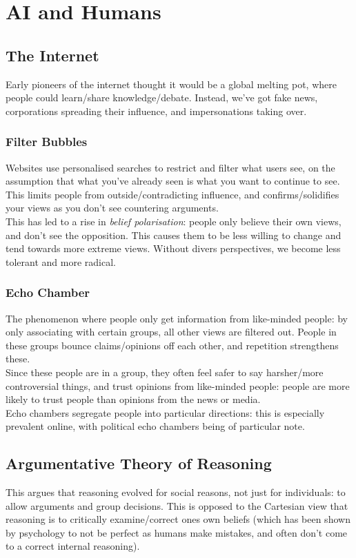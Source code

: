 \section{AI and Humans}

\subsection{The Internet}
Early pioneers of the internet thought it would be a global melting pot, where people could learn/share knowledge/debate. Instead, we've got fake news, corporations spreading their influence, and impersonations taking over.\\

\subsubsection{Filter Bubbles}
Websites use personalised searches to restrict and filter what users see, on the assumption that what you've already seen is what you want to continue to see. This limits people from outside/contradicting influence, and confirms/solidifies your views as you don't see countering arguments.\\
This has led to a rise in \emph{belief polarisation}: people only believe their own views, and don't see the opposition. This causes them to be less willing to change and tend towards more extreme views. Without divers perspectives, we become less tolerant and more radical.

\subsubsection{Echo Chamber}
The phenomenon where people only get information from like-minded people: by only associating with certain groups, all other views are filtered out. People in these groups bounce claims/opinions off each other, and repetition strengthens these. \\
Since these people are in a group, they often feel safer to say harsher/more controversial things,  and trust opinions from like-minded people: people are more likely to trust people than opinions from the news or media.\\
Echo chambers segregate people into particular directions: this is especially prevalent online, with political echo chambers being of particular note.

\subsection{Argumentative Theory of Reasoning}
This argues that reasoning evolved for social reasons, not just for individuals: to allow arguments and group decisions. This is opposed to the Cartesian view that reasoning is to critically examine/correct ones own beliefs (which has been shown by psychology to not be perfect as humans make mistakes, and often don't come to a correct internal reasoning). \\

